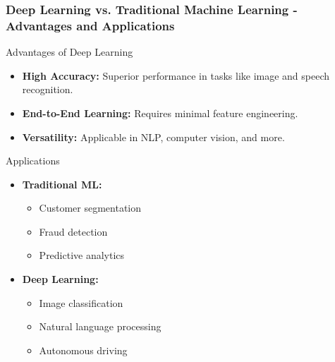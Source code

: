 \documentclass[aspectratio=169]{beamer}
\begin{document}
\begin{frame}[fragile]
    \frametitle{Deep Learning vs. Traditional Machine Learning - Advantages and Applications}
    \begin{block}{Advantages of Deep Learning}
        \begin{itemize}
            \item \textbf{High Accuracy:} Superior performance in tasks like image and speech recognition.
            \item \textbf{End-to-End Learning:} Requires minimal feature engineering.
            \item \textbf{Versatility:} Applicable in NLP, computer vision, and more.
        \end{itemize}
    \end{block}

    \begin{block}{Applications}
        \begin{itemize}
            \item \textbf{Traditional ML:}
                \begin{itemize}
                    \item Customer segmentation
                    \item Fraud detection
                    \item Predictive analytics
                \end{itemize}
            \item \textbf{Deep Learning:}
                \begin{itemize}
                    \item Image classification
                    \item Natural language processing
                    \item Autonomous driving
                \end{itemize}
        \end{itemize}
    \end{block}
\end{frame}
\end{document}
